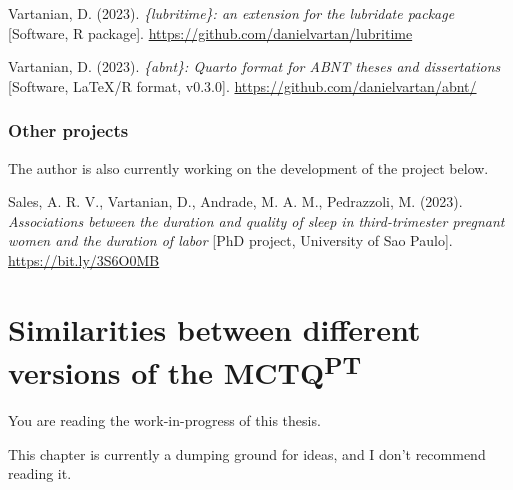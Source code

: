\documentclass[
12pt,
openright,
oneside,
a4paper,
chapter=TITLE,
section=TITLE,
french,
spanish,
brazil,
english
]{abntex2}\usepackage{array}
\newcommand{\microskip}{\vspace{\microskipamount}}
\begin{document}
\microskip

\noindent Vartanian, D. (2023). \emph{\{lubritime\}: an extension for
the lubridate package} {[}Software, R package{]}.
\url{https://github.com/danielvartan/lubritime}

\microskip

\noindent Vartanian, D. (2023). \emph{\{abnt\}: Quarto format for ABNT
theses and dissertations} {[}Software, LaTeX/R format, v0.3.0{]}.
\url{https://github.com/danielvartan/abnt/}

\subsection{Other projects}\label{other-projects}

The author is also currently working on the development of the project
below.

\smallskip

\noindent Sales, A. R. V., Vartanian, D., Andrade, M. A. M., Pedrazzoli,
M. (2023). \emph{Associations between the duration and quality of sleep
in third-trimester pregnant women and the duration of labor} {[}PhD
project, University of Sao Paulo{]}. \url{https://bit.ly/3S6O0MB}


\chapter{\texorpdfstring{Similarities between different versions of the
MCTQ\textsuperscript{PT}}{Similarities between different versions of the MCTQPT}}\label{similarities-between-different-versions-of-the-mctqpt}

\begin{tcolorbox}[enhanced jigsaw, colframe=quarto-callout-important-color-frame, coltitle=black, opacityback=0, left=2mm, opacitybacktitle=0.6, rightrule=.15mm, leftrule=.75mm, colbacktitle=quarto-callout-important-color!10!white, titlerule=0mm, title=\textcolor{quarto-callout-important-color}{\faExclamation}\hspace{0.5em}{Important}, colback=white, breakable, bottomtitle=1mm, toptitle=1mm, arc=.35mm, bottomrule=.15mm, toprule=.15mm]

You are reading the work-in-progress of this thesis.

\microskip

This chapter is currently a dumping ground for ideas, and I don't
recommend reading it.

\end{tcolorbox}
\end{document}
